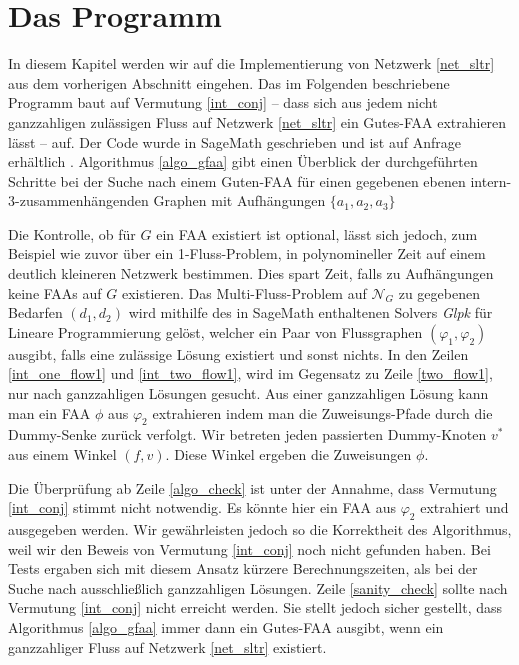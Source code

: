 \chapter{Das Programm}\label{the_program}

In diesem Kapitel werden wir auf die Implementierung von Netzwerk \ref{net_sltr} aus dem vorherigen Abschnitt eingehen. Das im Folgenden beschriebene Programm baut auf Vermutung \ref{int_conj} -- dass sich aus jedem nicht ganzzahligen zulässigen Fluss auf Netzwerk \ref{net_sltr} ein Gutes-FAA extrahieren lässt -- auf. Der Code wurde in SageMath geschrieben und ist auf Anfrage erhältlich \cite{sage}. Algorithmus \ref{algo_gfaa} gibt einen Überblick der durchgeführten Schritte bei der Suche nach einem Guten-FAA für einen gegebenen ebenen intern-3-zusammenhängenden Graphen mit Aufhängungen $\{a_1,a_2,a_3\}$



Die Kontrolle, ob für $G$ ein FAA existiert ist optional, lässt sich jedoch, zum Beispiel wie zuvor über ein 1-Fluss-Problem, in polynomineller Zeit auf einem deutlich kleineren Netzwerk bestimmen. Dies spart Zeit, falls zu Aufhängungen keine FAAs auf $G$ existieren. Das Multi-Fluss-Problem auf $\mathcal{N}_G$ zu gegebenen Bedarfen $(d_1,d_2)$ wird mithilfe des in SageMath enthaltenen Solvers \textit{Glpk} für Lineare Programmierung gelöst, welcher ein Paar von Flussgraphen $(\varphi_1,\varphi_2)$ ausgibt, falls eine zulässige Lösung existiert und sonst nichts\cite{glpk,sage}. In den Zeilen \ref{int_one_flow1} und \ref{int_two_flow1}, wird im Gegensatz zu Zeile \ref{two_flow1}, nur nach ganzzahligen Lösungen gesucht. Aus einer ganzzahligen Lösung kann man ein FAA $\phi$ aus $\varphi_2$ extrahieren indem man die Zuweisungs-Pfade durch die Dummy-Senke zurück verfolgt. Wir betreten jeden passierten Dummy-Knoten $v^*$ aus einem Winkel $(f,v)$. Diese Winkel ergeben die Zuweisungen $\phi$.

Die Überprüfung ab Zeile \ref{algo_check} ist unter der Annahme, dass Vermutung \ref{int_conj} stimmt nicht notwendig. Es könnte hier ein FAA aus $\varphi_2$ extrahiert und ausgegeben werden. Wir gewährleisten  jedoch so die Korrektheit des Algorithmus, weil wir den Beweis von Vermutung \ref{int_conj} noch nicht gefunden haben. Bei Tests ergaben sich mit diesem Ansatz kürzere Berechnungszeiten, als bei der Suche nach ausschließlich ganzzahligen Lösungen. Zeile \ref{sanity_check} sollte nach Vermutung \ref{int_conj} nicht erreicht werden. Sie stellt jedoch sicher gestellt, dass Algorithmus \ref{algo_gfaa} immer dann ein Gutes-FAA ausgibt, wenn ein ganzzahliger Fluss auf Netzwerk \ref{net_sltr} existiert.

